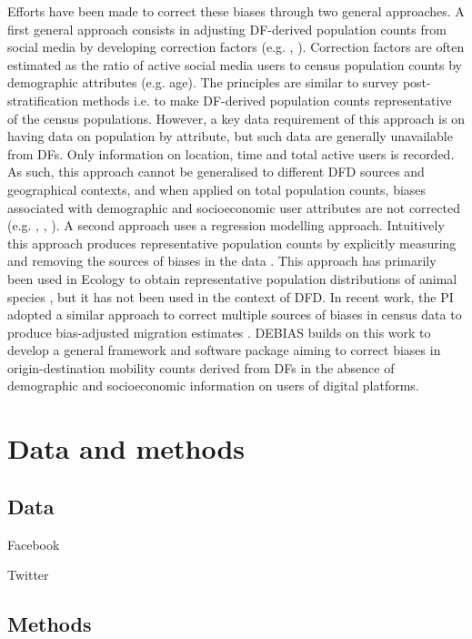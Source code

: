 \documentclass[]{rsos}%
\begin{document}
Efforts have been made to correct these biases through two general approaches. A first general
approach consists in adjusting DF-derived population counts from social media by developing
correction factors (e.g. \cite{yildiz17-twitter}, \cite{hsiao24-bias}). Correction factors are often estimated as the ratio of active social media users to census population counts by demographic attributes (e.g. age). The principles are similar to survey post-stratification methods i.e. to make DF-derived population counts representative of the census populations. However, a key data requirement of this approach is on having data on population by attribute, but such data are generally unavailable from DFs. Only information on location, time and total active users is recorded. As such, this approach cannot be generalised to different DFD sources and geographical contexts, and when applied on total population counts, biases associated with demographic and socioeconomic user attributes are not corrected (e.g. \cite{rodriguez-carrion18-biases}, \cite{schlosser21-biases}, \cite{pak22-correcting-bias}). A second approach uses a regression modelling approach. Intuitively this approach produces representative population counts by explicitly measuring and removing the sources of biases in the data \cite{kramer-schadt13-bias-correction}. This approach has primarily been used in Ecology to obtain representative population distributions of animal species \cite{zizka21-sampbias}, but it has not been used in the context of DFD. In recent work, the PI adopted a similar approach to correct multiple sources of biases in census data to produce bias-adjusted migration estimates \cite{aparicio-castro23-bayesian}. DEBIAS builds on this work to develop a general framework and software package aiming to correct biases in origin-destination mobility counts derived from DFs in the absence of demographic and socioeconomic information on users of digital platforms.

\section{Data and methods}\label{data-and-methods}

\subsection{Data}\label{data}

Facebook

Twitter

\subsection{Methods}\label{methods}
\end{document}

